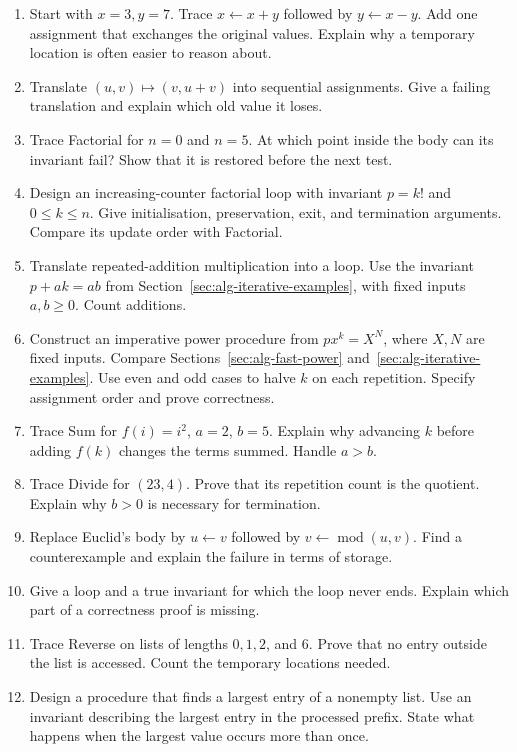 \begin{enumerate}
\setlength{\itemsep}{1pt}\setlength{\parsep}{0pt}
\item Start with $x=3,y=7$. Trace $x\leftarrow x+y$ followed by
$y\leftarrow x-y$. Add one assignment that exchanges the original values.
Explain why a temporary location is often easier to reason about.
\item Translate $(u,v)\mapsto(v,u+v)$ into sequential assignments.
Give a failing translation and explain which old value it loses.
\item Trace Factorial for $n=0$ and $n=5$. At which point inside the body
can its invariant fail? Show that it is restored before the next test.
\item Design an increasing-counter factorial loop with invariant
$p=k!$ and $0\leq k\leq n$. Give initialisation, preservation, exit, and
termination arguments. Compare its update order with Factorial.
\item Translate repeated-addition multiplication into a loop. Use the
invariant $p+ak=ab$ from Section~\ref{sec:alg-iterative-examples}, with
fixed inputs $a,b\geq0$. Count additions.
\item Construct an imperative power procedure from $p x^k=X^N$, where
$X,N$ are fixed inputs. Compare Sections~\ref{sec:alg-fast-power}
and~\ref{sec:alg-iterative-examples}. Use even and odd cases to halve $k$ on each
repetition. Specify assignment order and prove correctness.
\item Trace Sum for $f(i)=i^2$, $a=2$, $b=5$. Explain why advancing $k$
before adding $f(k)$ changes the terms summed. Handle $a>b$.
\item Trace Divide for $(23,4)$. Prove that its repetition count is the
quotient. Explain why $b>0$ is necessary for termination.
\item Replace Euclid's body by $u\leftarrow v$ followed by
$v\leftarrow\operatorname{mod}(u,v)$. Find a counterexample and explain
the failure in terms of storage.
\item Give a loop and a true invariant for which the loop never ends.
Explain which part of a correctness proof is missing.
\item Trace Reverse on lists of lengths $0,1,2$, and $6$. Prove that no
entry outside the list is accessed. Count the temporary locations needed.
\item Design a procedure that finds a largest entry of a nonempty list.
Use an invariant describing the largest entry in the processed prefix.
State what happens when the largest value occurs more than once.

\end{enumerate}
